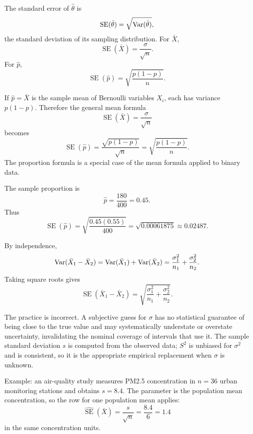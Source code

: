 \begin{solproblema}[prob:395183d]
The standard error of $\hat\theta$ is
\[
	\operatorname{SE}(\hat\theta)=\sqrt{\operatorname{Var}(\hat\theta)},
\]
the standard deviation of its sampling distribution. For $\bar X$,
\[
	\operatorname{SE}(\bar X)=\frac{\sigma}{\sqrt n}.
\]
For $\hat p$,
\[
	\operatorname{SE}(\hat p)=\sqrt{\frac{p(1-p)}{n}}.
\]
\end{solproblema}

\begin{solproblema}[prob:8a98763]
If $\hat p=\bar X$ is the sample mean of Bernoulli variables $X_i$, each has variance $p(1-p)$. Therefore the general mean formula
\[
	\operatorname{SE}(\bar X)=\frac{\sigma}{\sqrt n}
\]
becomes
\[
	\operatorname{SE}(\hat p)=\frac{\sqrt{p(1-p)}}{\sqrt n}
	=\sqrt{\frac{p(1-p)}{n}}.
\]
The proportion formula is a special case of the mean formula applied to binary data.
\end{solproblema}

\begin{solproblema}[prob:0d972a2]
The sample proportion is
\[
	\hat p=\frac{180}{400}=0.45.
\]
Thus
\[
	\widehat{\operatorname{SE}}(\hat p)
	=\sqrt{\frac{0.45(0.55)}{400}}
	=\sqrt{0.00061875}\approx0.02487.
\]
\end{solproblema}

\begin{solproblema}[prob:a48a78a]
By independence,
\[
	\operatorname{Var}(\bar X_1-\bar X_2)=\operatorname{Var}(\bar X_1)+\operatorname{Var}(\bar X_2)
	=\frac{\sigma_1^2}{n_1}+\frac{\sigma_2^2}{n_2}.
\]
Taking square roots gives
\[
	\operatorname{SE}(\bar X_1-\bar X_2)
	=\sqrt{\frac{\sigma_1^2}{n_1}+\frac{\sigma_2^2}{n_2}}.
\]
\end{solproblema}

\begin{solproblema}
The practice is incorrect. A subjective guess for $\sigma$ has no statistical guarantee of being close to the true value and may systematically understate or overstate uncertainty, invalidating the nominal coverage of intervals that use it. The sample standard deviation $s$ is computed from the observed data; $S^2$ is unbiased for $\sigma^2$ and is consistent, so it is the appropriate empirical replacement when $\sigma$ is unknown.
\end{solproblema}

\begin{solproblema}
Example: an air-quality study measures PM2.5 concentration in $n=36$ urban monitoring stations and obtains $s=8.4$. The parameter is the population mean concentration, so the row for one population mean applies:
\[
	\widehat{\operatorname{SE}}(\bar X)=\frac{s}{\sqrt n}=\frac{8.4}{6}=1.4
\]
in the same concentration units.
\end{solproblema}
